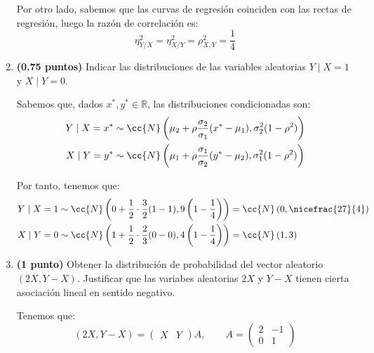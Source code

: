 \documentclass[12pt]{article}
\begin{document}
\begin{ejercicio}[2.5 puntos]
\begin{enumerate}
            Por otro lado, sabemos que las curvas de regresión coinciden con las rectas de regresión, luego la razón de correlación es:
            \begin{equation*}
                \eta_{Y/X}^2=\eta_{X/Y}^2 = \rho_{X,Y}^2 = \dfrac{1}{4}
            \end{equation*}

            \item \textbf{(0.75 puntos)} Indicar las distribuciones de las variables aleatorias $Y\mid X = 1$ y $X\mid Y=0$.
            
            Sabemos que, dados $x^*,y^*\in \mathbb{R}$, las distribuciones condicionadas son:
            \begin{align*}
                Y\mid X=x^* &\sim \cc{N}\left(\mu_2+\rho\frac{\sigma_2}{\sigma_1}(x^*-\mu_1),\sigma_2^2(1-\rho^2)\right)\\
                X\mid Y=y^* &\sim \cc{N}\left(\mu_1+\rho\frac{\sigma_1}{\sigma_2}(y^*-\mu_2),\sigma_1^2(1-\rho^2)\right)
            \end{align*}

            Por tanto, tenemos que:
            \begin{align*}
                Y\mid X=1 &\sim \cc{N}\left(0+\dfrac{1}{2}\cdot \dfrac{3}{2}(1-1),9\left(1-\dfrac{1}{4}\right)\right)
                = \cc{N}\left(0,\nicefrac{27}{4}\right)\\
                X\mid Y=0 &\sim \cc{N}\left(1+\dfrac{1}{2}\cdot \dfrac{2}{3}(0-0),4\left(1-\dfrac{1}{4}\right)\right)
                = \cc{N}\left(1,3\right)
            \end{align*}
            \item \textbf{(1 punto)} Obtener la distribución de probabilidad del vector aleatorio $(2X, Y-X)$. Justificar que las variabes aleatorias $2X$ y $Y-X$ tienen cierta asociación lineal en sentido negativo.
            
            Tenemos que:
            \begin{equation*}
                (2X,Y-X) = \begin{pmatrix}
                    X & Y
                \end{pmatrix}A,\qquad A = 
                \begin{pmatrix}
                    2 & -1 \\ 0 & 1
                \end{pmatrix}
            \end{equation*}


\end{enumerate}
\end{ejercicio}
\end{document}

